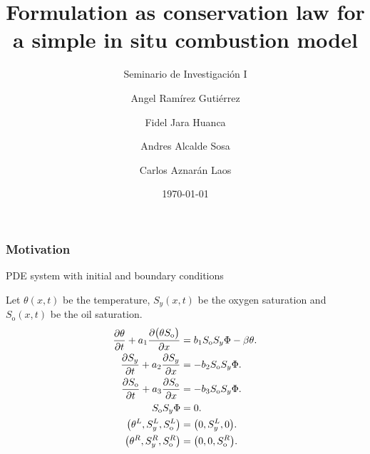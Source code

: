 \documentclass[
    8pt,
    aspectratio=1610,
    c,
    intlimits,
		handout,
    leqno,
    professionalfonts,
]{beamer}
\title{Formulation as conservation law for a simple in situ combustion model}
\subtitle{Seminario de Investigación I}
\author{Angel Ramírez Gutiérrez\and Fidel Jara Huanca\and Andres Alcalde Sosa\and Carlos Aznarán Laos}
\institute{\small Instituto de Matemática y Ciencias Afines}
\date{\today}
\begin{document}
\begin{frame}
	\titlepage
\end{frame}

\begin{frame}
	\frametitle{Motivation}
	\begin{block}{PDE system with initial and boundary
			conditions~\cite{Quispe2020}}

		Let $\theta\left(x,t\right)$ be the \alert{temperature},
		$S_{y}\left(x,t\right)$ be the \alert{oxygen saturation} and
		$S_{\text{o}}\left(x,t\right)$ be the \alert{oil saturation}.
		\begin{align}
			\diffp{\theta}{t}+
			a_{1}
			\diffp{
				\big(
				\theta
				S_{\text{o}}
				\big)
			}{x}                    & =
			b_{1}
			S_{\text{o}}
			S_{y}
			\Phi-
			\beta\theta.
			\label{eq:6}                \\
			\diffp{S_{y}}{t}+
			a_{2}
			\diffp{S_{y}}{x}        & =
			-b_{2}
			S_{\text{o}}
			S_{y}
			\Phi.
			\label{eq:7}                \\
			\diffp{S_{\text{o}}}{t}+
			a_{3}
			\diffp{S_{\text{o}}}{x} & =
			-b_{3}
			S_{\text{o}}
			S_{y}
			\Phi.
			\label{eq:8}                \\
			S_{\text{o}}
			S_{y}
			\Phi                    & =
			0.                          \\
			\big(
			\theta^{L},
			S^{L}_{y},
			S^{L}_{\text{o}}
			\big)                   & =
			\big(
			0,
			S^{L}_{y},
			0
			\big).                      \\
			\big(
			\theta^{R},
			S^{R}_{y},
			S^{R}_{\text{o}}
			\big)                   & =
			\big(
			0,
			0,
			S^{R}_{\text{o}}
			\big).
		\end{align}
	\end{block}
\end{frame}
\end{document}
